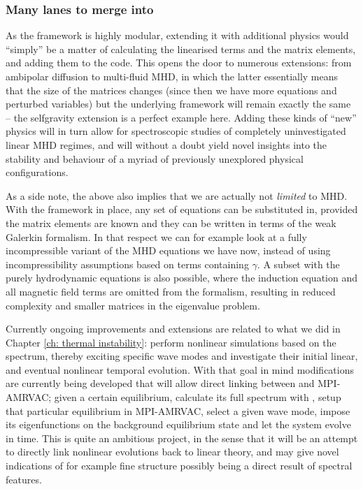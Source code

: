 \subsubsection{Many lanes to merge into}
As the {\legolas} framework is highly modular, extending it with additional physics would ``simply'' be a matter of calculating the linearised terms and the matrix elements, and adding them to the code. This opens the door to numerous extensions: from ambipolar diffusion to multi-fluid MHD, in which the latter essentially means that the size of the matrices changes (since then we have more equations and perturbed variables) but the underlying framework will remain exactly the same -- the selfgravity extension is a perfect example here. Adding these kinds of ``new'' physics will in turn allow for spectroscopic studies of completely uninvestigated linear MHD regimes, and will without a doubt yield novel insights into the stability and behaviour of a myriad of previously unexplored physical configurations.

As a side note, the above also implies that we are actually not \emph{limited} to MHD. With the framework in place, any set of equations can be substituted in, provided the matrix elements are known and they can be written in terms of the weak Galerkin formalism. In that respect we can for example look at a fully incompressible variant of the MHD equations we have now, instead of using incompressibility assumptions based on terms containing $\gamma$. A subset with the purely hydrodynamic equations is also possible, where the induction equation and all magnetic field terms are omitted from the formalism, resulting in reduced complexity and smaller matrices in the eigenvalue problem.

Currently ongoing improvements and extensions are related to what we did in Chapter \ref{ch: thermal instability}: perform nonlinear simulations based on the spectrum, thereby exciting specific wave modes and investigate their initial linear, and eventual nonlinear temporal evolution. With that goal in mind modifications are currently being developed that will allow direct linking between {\legolas} and MPI-AMRVAC; given a certain equilibrium, calculate its full spectrum with {\legolas}, setup that particular equilibrium in MPI-AMRVAC, select a given wave mode, impose its eigenfunctions on the background equilibrium state and let the system evolve in time. This is quite an ambitious project, in the sense that it will be an attempt to directly link nonlinear evolutions back to linear theory, and may give novel indications of for example fine structure possibly being a direct result of spectral features.


